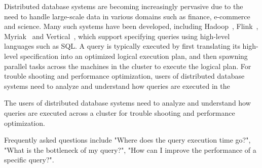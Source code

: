 



Distributed database systems are becoming increasingly pervasive due to the need to handle large-scale data in various domains such as finance, e-commerce and science. Many such systems have been developed, including Hadoop~\cite{hadoop}, Flink~\cite{carbone2015apache}, Myriak~\cite{} and Vertical~\cite{}, which support specifying queries using high-level languages such as SQL. A query is typically executed by first translating its high-level specification into an optimized logical execution plan, and then spawning parallel tasks across the machines in the cluster to execute the logical plan. For trouble shooting and performance optimization, users of distributed database systems need to analyze and understand how queries are executed in the    

The users of distributed database systems need to analyze and understand how queries are executed across a cluster for trouble shooting and performance optimization.  


Frequently asked questions include "Where does the query execution time go?", "What is the bottleneck of my query?", "How can I improve the performance of a specific query?".    





